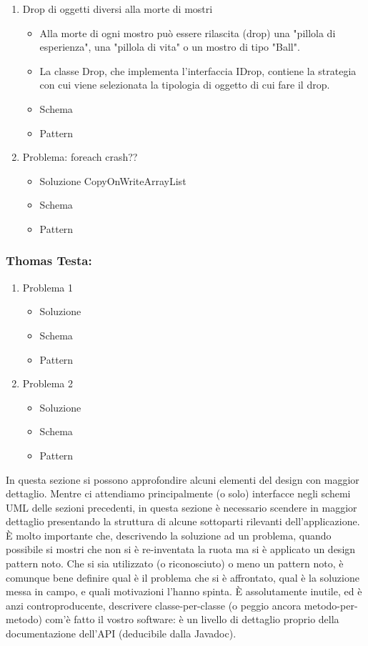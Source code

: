 \documentclass[a4paper,12pt]{report}
\begin{document}
\begin{enumerate}
\begin{itemize}
\end{itemize}
%
\item Drop di oggetti diversi alla morte di mostri
%
\begin{itemize}
	\item Alla morte di ogni mostro può essere rilascita (drop) una "pillola di esperienza", una "pillola di vita" o un mostro di tipo "Ball".
	\item La classe Drop, che implementa l'interfaccia IDrop, contiene la strategia con cui viene selezionata la tipologia di oggetto di cui fare il drop.
	\item Schema
	\item Pattern
\end{itemize}
%	
\item Problema: foreach crash??
\begin{itemize}
	\item Soluzione CopyOnWriteArrayList
	\item Schema
	\item Pattern
\end{itemize}
\end{enumerate}
%

\subsubsection*{Thomas Testa:}
%
\begin{enumerate}
	\item Problema 1
	\begin{itemize}
		\item Soluzione
		\item Schema
		\item Pattern
	\end{itemize}
	\item Problema 2
	\begin{itemize}
		\item Soluzione
		\item Schema
		\item Pattern
	\end{itemize}
\end{enumerate}
%

In questa sezione si possono approfondire alcuni elementi del design con maggior dettaglio.
%
Mentre ci attendiamo principalmente (o solo) interfacce negli schemi UML delle sezioni precedenti,
in questa sezione è necessario scendere in maggior dettaglio presentando la struttura di alcune sottoparti rilevanti dell'applicazione.
%
È molto importante che, descrivendo la soluzione ad un problema, quando possibile si mostri che non si è re-inventata la ruota ma si è applicato un design pattern noto.
%
Che si sia utilizzato (o riconosciuto) o meno un pattern noto, è comunque bene definire qual è il problema che si è affrontato, qual è la soluzione messa in campo, e quali motivazioni l'hanno spinta.
%
È assolutamente inutile, ed è anzi controproducente, descrivere classe-per-classe (o peggio ancora metodo-per-metodo) com'è fatto il vostro software: è un livello di dettaglio proprio della documentazione dell'API (deducibile dalla Javadoc).
\end{document}
